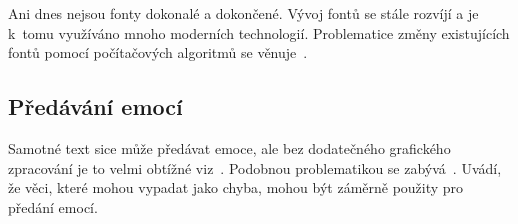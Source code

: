 \documentclass{article}
\begin{document}
Ani dnes nejsou fonty dokonalé a dokončené. Vývoj fontů se stále rozvíjí a je k~tomu využíváno mnoho moderních technologií.
Problematice změny existujících fontů pomocí počítačových algoritmů se věnuje~\cite{thesis:jiricek}.

\subsection{Předávání emocí}
\label{sec:emotions}
Samotné text sice může předávat emoce, ale bez dodatečného grafického zpracování je to velmi obtížné viz~\cite{article:aynsley}.
Podobnou problematikou se zabývá~\cite{article:kinross}. Uvádí, že věci, které mohou vypadat jako chyba, mohou být záměrně použity pro předání emocí.


\end{document}
